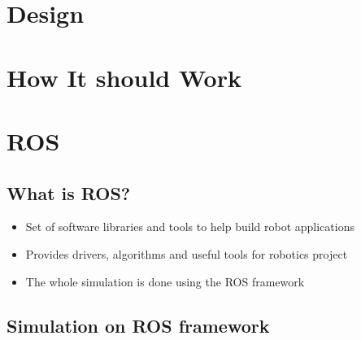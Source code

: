 \documentclass[a0,portrait]{a0poster}
\begin{document}
\begin{multicols}{2}
  \section*{Design}
  \begin{center}\vspace{1cm}
  \end{center}%


  \color{Black} %

  \section*{How It should Work}

  \begin{center}\vspace{1cm}
  \end{center}
  \vspace{1cm}

  \section*{ROS}
  \subsection*{What is ROS?}
  \begin{itemize}
  \item Set of software libraries and tools to help build robot applications
  \item Provides drivers, algorithms and useful tools for robotics project
  \item The whole simulation is done using the ROS framework
  \end{itemize}
  \subsection*{Simulation on ROS framework}

\end{multicols}
\end{document}
